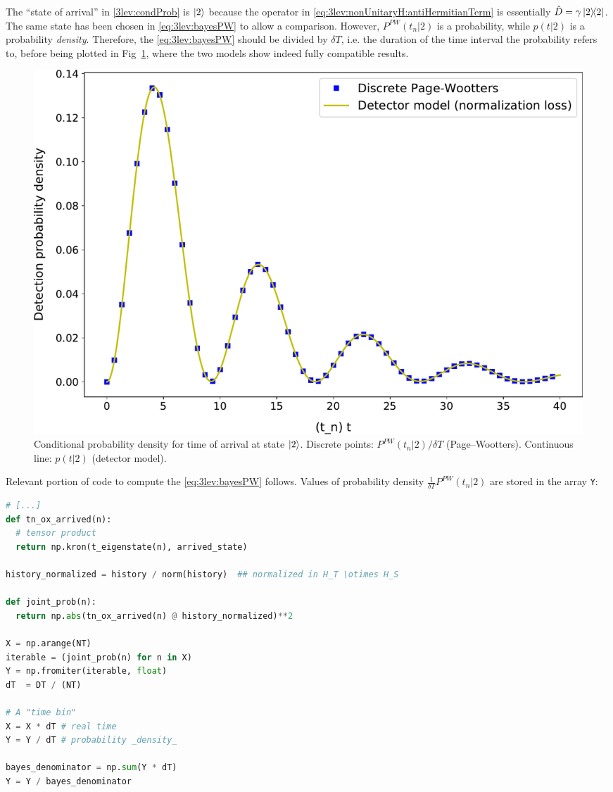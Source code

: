 The ``state of arrival'' in \eqref{3lev:condProb} is $\ket{2}$
because the operator
in \eqref{eq:3lev:nonUnitaryH:antiHermitianTerm}
is essentially $\hat{D} = \gamma \ketbra{2}$. The same
state has been chosen in \eqref{eq:3lev:bayesPW}
to allow a comparison. However, $P^{PW}(t_n|2)$ is a probability,
while $p(t|2)$ is a probability \emph{density}.
Therefore, the \eqref{eq:3lev:bayesPW} should be divided by $\delta T$,
i.e. the duration of the time interval the probability refers to,
before being plotted in Fig~\ref{fig:3lev:condProb},
where the two models show indeed fully compatible results.
\begin{figure}[]
  \centering
  \includegraphics[width=\textwidth]{img/3ldetect/conditionalProbFit.pdf}
  \caption{
    Conditional probability density for time of arrival at state $\ket{2}$.
    Discrete points: $P^{PW}(t_n|2) / \delta{T}$ (Page--Wootters).
    Continuous line: $p(t|2)$ (detector model).
  }
  \label{fig:3lev:condProb}
\end{figure}

Relevant portion of code to compute the \eqref{eq:3lev:bayesPW} follows.
Values of probability density
$\frac{1}{\delta{T}}  P^{PW}(t_n|2)$
are stored in the array \Verb|Y|:
\begin{lstlisting}[language=Python]
# [...]
def tn_ox_arrived(n):
  # tensor product
  return np.kron(t_eigenstate(n), arrived_state)

history_normalized = history / norm(history)  ## normalized in H_T \otimes H_S

def joint_prob(n):
  return np.abs(tn_ox_arrived(n) @ history_normalized)**2

X = np.arange(NT)
iterable = (joint_prob(n) for n in X)
Y = np.fromiter(iterable, float)
dT  = DT / (NT)

# A "time bin"
X = X * dT # real time
Y = Y / dT # probability _density_

bayes_denominator = np.sum(Y * dT)
Y = Y / bayes_denominator
\end{lstlisting}

